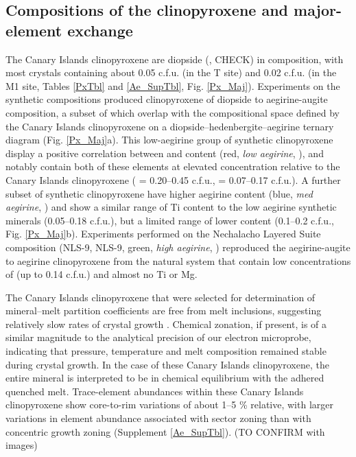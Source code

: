 \documentclass[final,authoryear,3p,times,twocolumn]{elsarticle}
\begin{document}

\subsection{Compositions of the clinopyroxene and major-element exchange}
The Canary Islands clinopyroxene are diopside (,  CHECK) in composition, with most crystals containing about 0.05 c.f.u.  (in the T site) and 0.02 c.f.u.  (in the M1 site, Tables \ref{PxTbl} and \ref{Ae_SupTbl}, Fig. \ref{Px_Maj}). 
Experiments on the synthetic compositions produced clinopyroxene of diopside to aegirine-augite composition, a subset of which overlap with the compositional space defined by the Canary Islands clinopyroxene on a diopside--hedenbergite--aegirine ternary diagram (Fig. \ref{Px_Maj}a). This low-aegirine group of synthetic clinopyroxene display a positive correlation between  and  content (red, \emph{low aegirine}, ), and notably contain both of these elements at elevated concentration relative to the Canary Islands clinopyroxene ( = 0.20--0.45 c.f.u.,  = 0.07--0.17 c.f.u.). A further subset of synthetic clinopyroxene have higher aegirine content (blue, \emph{med aegirine}, ) and show a similar range of Ti content to the low aegirine synthetic minerals (0.05--0.18 c.f.u.), but a limited range of lower  content (0.1--0.2 c.f.u., Fig. \ref{Px_Maj}b). Experiments performed on the Nechalacho Layered Suite composition (NLS-9, NLS-9, green, \emph{high aegirine}, ) reproduced the aegirine-augite to aegirine clinopyroxene from the natural system \citep{Moller2016} that contain low concentrations of  (up to 0.14 c.f.u.) and almost no Ti or Mg.


 The Canary Islands clinopyroxene that were selected for determination of mineral--melt partition coefficients are free from melt inclusions, suggesting relatively slow rates of crystal growth \citep[][Fig. \ref{3_ChemTransect}]{Kennedy1993}. Chemical zonation, if present, is of a similar magnitude to the analytical precision of our electron microprobe, indicating that pressure, temperature and melt composition remained stable during crystal growth. In the case of these Canary Islands clinopyroxene, the entire mineral is interpreted to be in chemical equilibrium with the adhered quenched melt. %
Trace-element abundances within these Canary Islands clinopyroxene show core-to-rim variations of about 1--5 \% relative, with larger variations in element abundance associated with sector zoning than with concentric growth zoning (Supplement \ref{Ae_SupTbl}). (TO CONFIRM with images)
\end{document}
